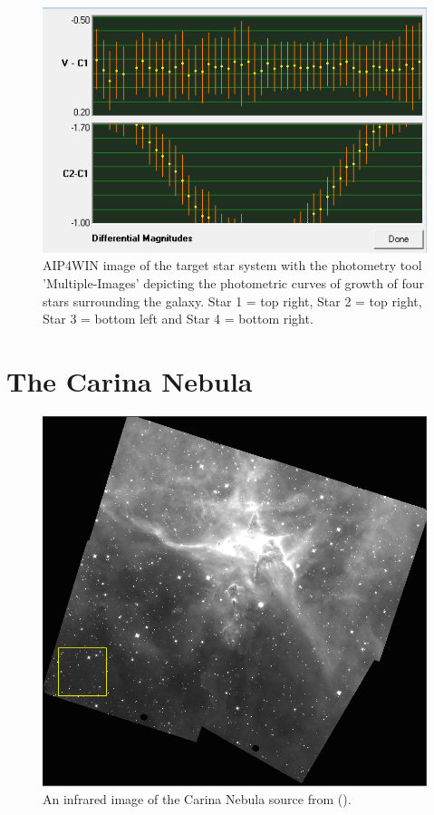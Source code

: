 \documentclass[12pt]{article}
\begin{document}
\begin{figure}[H]
\begin{multicols}{2}
\includegraphics[scale=0.65]{Images/AsImages/MI/Sr4-Profile.PNG}
\end{multicols}
\caption{AIP4WIN image of the target star system with the photometry tool 'Multiple-Images' depicting the photometric curves of growth of four stars surrounding the galaxy. Star 1 = top right, Star 2 = top right, Star 3 = bottom left and Star 4 = bottom right.}
\label{MI-Profile}
\end{figure}

\section{The Carina Nebula}
\label{Section 4}

\begin{figure}[H]
\centering
\includegraphics[scale=0.6]{Images/AsImages/CN/Crop.PNG}
\caption{An infrared image of the Carina Nebula source from (\cite{CarNeb}).}
\label{Carina}
\end{figure}
\end{document}
